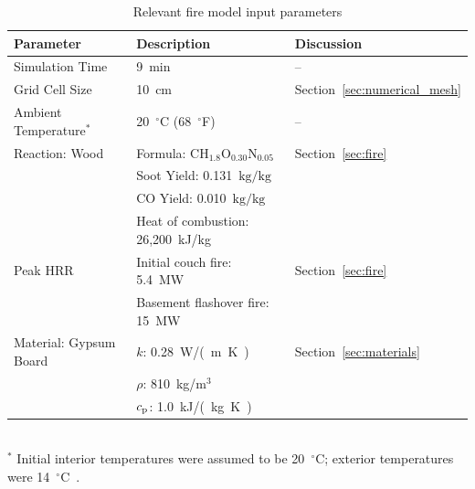 \documentclass[12pt,oneside]{book}
\renewcommand{\C}{\mbox{C}}
\renewcommand{\H}{\mbox{H}}
\renewcommand{\O}{\mbox{O}}
\newcommand{\N}{\mbox{N}}
\begin{document}
\begin{table}[!ht]
\caption[Relevant fire model input parameters]{Relevant fire model input parameters}
\begin{tabular}{lll}
\toprule
Parameter                                 &  Description                                  &  Discussion                        \\
\midrule
Simulation Time                           &  9~min                                        &  --                                \\
Grid Cell Size                            &  10~cm                                        &  Section~\ref{sec:numerical_mesh}  \\
Ambient Temperature$^*$                   &  20~$^{\circ}$C (68~$^{\circ}$F)              &  --                                \\
Reaction: Wood~\cite{SFPE:Tewarson}       &  Formula: $\C\H_{1.8}\O_{0.30}\N_{0.05}$      &  Section~\ref{sec:fire}            \\
                                          &  Soot Yield: 0.131~$\mathrm{kg}/\mathrm{kg}$  &                                    \\
                                          &  CO Yield: 0.010~$\mathrm{kg}/\mathrm{kg}$    &                                    \\
                                          &  Heat of combustion: 26,200~kJ/kg             &                                    \\
Peak HRR                                  &  Initial couch fire: 5.4~MW                   &  Section~\ref{sec:fire}            \\
                                          &  Basement flashover fire: 15~MW               &                                    \\
Material: Gypsum Board~\cite{WAKILI2007}  &  $k$: 0.28~\si{W/(m.K)}                       &  Section~\ref{sec:materials}       \\
                                          &  $\rho$: 810~kg/m$^3$                         &                                    \\
                                          &  $c_{\rm p}$: 1.0~\si{kJ/(kg.K)}                  &                                    \\
\bottomrule
\end{tabular}
\footnotesize
\\ $^{*}$ Initial interior temperatures were assumed to be 20~$^{\circ}$C; exterior temperatures were 14~$^{\circ}$C~\cite{NIOSH:Bowyer2}.
\normalsize
\label{tab:model_parameters}
\end{table}
\end{document}
